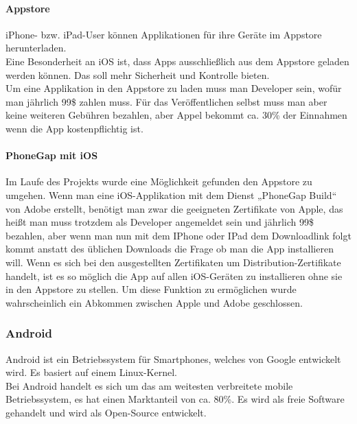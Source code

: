 \paragraph*{Appstore\\}
iPhone- bzw. iPad-User können Applikationen für ihre Geräte im Appstore herunterladen.\\ 
Eine Besonderheit an iOS ist, dass Apps ausschließlich aus dem Appstore geladen werden können. Das soll mehr Sicherheit und Kontrolle bieten.\\
Um eine Applikation in den Appstore zu laden muss man Developer sein, wofür man jährlich 99\$ zahlen muss. Für das Veröffentlichen selbst muss man aber keine weiteren Gebühren bezahlen, aber Appel bekommt ca. 30\% der Einnahmen wenn die App kostenpflichtig ist.\\
\paragraph*{PhoneGap mit iOS\\}
Im Laufe des Projekts wurde eine Möglichkeit gefunden den Appstore zu umgehen. Wenn man eine iOS-Applikation mit dem Dienst „PhoneGap Build“ von Adobe erstellt, benötigt man zwar die geeigneten Zertifikate von Apple, das heißt man muss trotzdem als Developer angemeldet sein und jährlich 99\$ bezahlen, aber wenn man nun mit dem IPhone oder IPad dem Downloadlink folgt kommt anstatt des üblichen Downloads die Frage ob man die App installieren will.
Wenn es sich bei den ausgestellten Zertifikaten um Distribution-Zertifikate handelt, ist es so möglich die App auf allen iOS-Geräten zu installieren ohne sie in den Appstore zu stellen. Um diese Funktion zu ermöglichen wurde wahrscheinlich ein Abkommen zwischen Apple und Adobe geschlossen.\\

\subsubsection{Android}
Android ist ein Betriebssystem für Smartphones, welches von Google entwickelt wird. Es basiert auf einem Linux-Kernel.\\
Bei Android handelt es sich um das am weitesten verbreitete mobile Betriebssystem, es hat einen Marktanteil von ca. 80\%. Es wird als freie Software gehandelt und wird als Open-Source entwickelt.\\
\\
